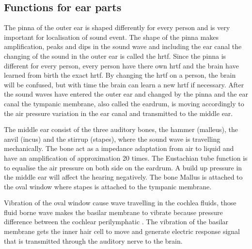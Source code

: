 \subsection{Functions for ear parts}
The pinna of the outer ear is shaped differently for every person and is very important for localisation of sound event. The shape of the pinna makes amplification, peaks and dips in the sound wave and including the ear canal the changing of the sound in the outer ear is called the \gls{hrtf}. Since the pinna is different for every person, every person have there own \gls{hrtf} and the brain have learned from birth the exact \gls{hrtf}. By changing the \gls{hrtf} on a person, the brain will be confused, but with time the brain can learn a new \gls{hrtf} if necessary. After the sound waves have entered the outer ear and changed by the pinna and the ear canal the tympanic membrane, also called the eardrum, is moving accordingly to the air pressure variation in the ear canal and transmitted to the middle ear.  

The middle ear consist of the three auditory bones, the hammer (malleus), the anvil (incus) and the stirrup (stapes), where the sound wave is travelling mechanically. The bone act as a impedance adaptation from air to liquid and have an amplification of approximation 20 times. The Eustachian tube function is to equalise the air pressure on both side on the eardrum. A build up pressure in the middle ear will affect the hearing negatively. The bone Mallus is attached to the oval window where stapes is attached to the tympanic membrane.

Vibration of the oval window cause wave travelling in the cochlea fluids, those fluid borne wave makes the basilar membrane to vibrate because pressure difference between the cochlear perilymphatic \citep{ho_2017}. The vibration of the basilar membrane gets the inner hair cell to move and generate electric response signal that is transmitted through the auditory nerve to the brain.



